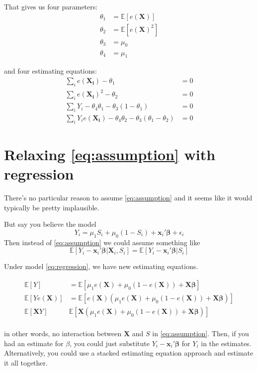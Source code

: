 \documentclass[11pt]{article} %
\newcommand{\EE}{\mathbb{E}}
\newcommand{\pp}{e(\bm{X})}
\newcommand{\ppi}{e(\bm{X_i})}
\begin{document}
That gives us four parameters:
\begin{align*}
  \theta_1&=\EE[\pp]\\
  \theta_2&=\EE[\pp^2]\\
  \theta_3&=\mu_0\\
  \theta_4&=\mu_1
\end{align*}

and four estimating equations:
\begin{align*}
  \sum_i \ppi-\theta_1&=0\\
  \sum_i \ppi^2-\theta_2&=0\\
  \sum_i Y_i-\theta_4\theta_1-\theta_3(1-\theta_1)&=0\\
  \sum_i Y_i\ppi-\theta_4\theta_2-\theta_3(\theta_1-\theta_2)&=0
\end{align*}


\section{Relaxing \eqref{eq:assumption} with regression}
There's no particular reason to assume \eqref{eq:assumption} and it seems like it would typically be pretty implausible. 

But say you believe the model
\begin{equation}\label{eq:regression}
Y_i=\mu_1S_i+\mu_0(1-S_i)+\bm{x}_i'\bm{\beta}+\epsilon_i
\end{equation}
 Then instead of \eqref{eq:assumption} we could assume something like
\begin{equation*}
\EE[Y_i-\bm{x}_i'\bm{\beta}|\bm{X}_i,S_i]=\EE[Y_i-\bm{x}_i'\bm{\beta}|S_i]
\end{equation*}

Under model \eqref{eq:regression}, we have new estimating equations.


\begin{align*}
  \EE[Y]&=\EE\left[\mu_1\pp+\mu_0(1-\pp)+\bm{X}\bm{\beta}\right]\\
  \EE[Y\pp]&=\EE\left[\pp\left(\mu_1\pp+\mu_0(1-\pp)+\bm{X}\bm{\beta}\right)\right]\\
  \EE[\bm{X}Y]&\EE\left[\bm{X}\left(\mu_1\pp+\mu_0(1-\pp)+\bm{X}\bm{\beta}\right)\right]\\
\end{align*}

in other words, no interaction between $\bm{X}$ and $S$ in \eqref{eq:assumption}. 
Then, if you had an estimate for $\beta$, you could just substitute $Y_i-\bm{x}_i'\bm{\beta}$ for $Y_i$ in the estimates. 
Alternatively, you could use a stacked estimating equation approach and estimate it all together.
\end{document}

